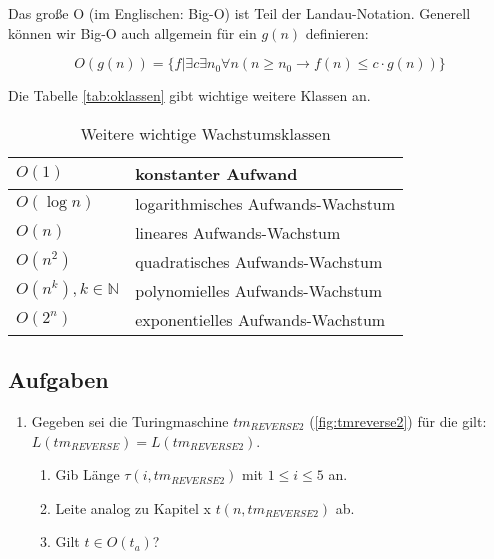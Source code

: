Das große O (im Englischen: Big-O) ist Teil der Landau-Notation.
Generell können wir Big-O auch allgemein für ein $g(n)$ definieren:

\[
O(g(n)) = \{f|\exists c \exists n_0 \forall n (n \geq n_0 \rightarrow f(n) \leq c \cdot g(n))\}
\]

Die Tabelle \autoref{tab:oklassen} gibt wichtige weitere Klassen an.

\begin{table}[ht]
    \caption{Weitere wichtige Wachstumsklassen}
    \centering
    \begin{tabular}{l l}
        \toprule
        $O(1)$ & konstanter Aufwand \\
        \midrule
        $O(\log n)$ & logarithmisches Aufwands-Wachstum \\
        \midrule
        $O(n)$ & lineares Aufwands-Wachstum \\
        \midrule
        $O(n^2)$ & quadratisches Aufwands-Wachstum \\
        \midrule
        $O(n^k),  k \in \mathbb{N}$ & polynomielles Aufwands-Wachstum \\
        \midrule
        $O(2^n)$ & exponentielles Aufwands-Wachstum \\
    \bottomrule
    \bottomrule
    \end{tabular}%
    \label{tab:oklassen}
\end{table}


\subsection*{Aufgaben}

\begin{enumerate}
    \item Gegeben sei die Turingmaschine $tm_{REVERSE2}$ (\autoref{fig:tmreverse2}) für die gilt: $L(tm_{REVERSE}) = L(tm_{REVERSE2})$.
            \begin{enumerate}
                \item Gib Länge $\tau(i, tm_{REVERSE2})$ mit $1 \leq i \leq 5$ an.
                \item Leite analog zu Kapitel x $t(n, tm_{REVERSE2})$ ab.
                \item Gilt $t \in O(t_{a})$?
            \end{enumerate}
\end{enumerate}

